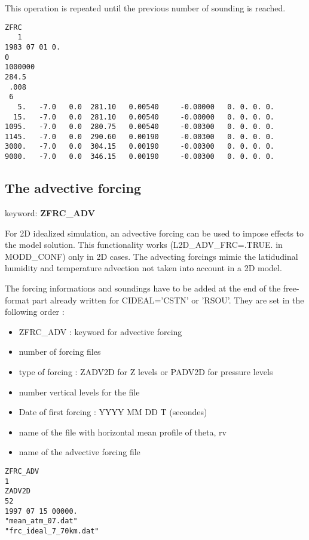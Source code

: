 This operation is repeated until the previous number of sounding is reached.

\begin{verbatim}
ZFRC
   1
1983 07 01 0.
0
1000000
284.5
 .008
 6
   5.   -7.0   0.0  281.10   0.00540     -0.00000   0. 0. 0. 0.
  15.   -7.0   0.0  281.10   0.00540     -0.00000   0. 0. 0. 0.
1095.   -7.0   0.0  280.75   0.00540     -0.00300   0. 0. 0. 0.
1145.   -7.0   0.0  290.60   0.00190     -0.00300   0. 0. 0. 0.
3000.   -7.0   0.0  304.15   0.00190     -0.00300   0. 0. 0. 0.
9000.   -7.0   0.0  346.15   0.00190     -0.00300   0. 0. 0. 0.
\end{verbatim}

\subsection{The advective forcing} \label{ss:adv_forcing}

keyword: {\bf ZFRC\_ADV} 

For 2D idealized simulation, an advective forcing can be used to impose effects to the model solution. This functionality works (L2D\_ADV\_FRC=.TRUE. in MODD\_CONF) only in 2D cases. The advecting forcings mimic the latidudinal humidity and temperature advection not taken into account in a 2D model.
         
The forcing informations and soundings have to be added at the end of the
free-format part already written for CIDEAL='CSTN' or 'RSOU'. They are set in the following order : 
\begin{itemize}
\item ZFRC\_ADV : keyword for advective forcing
\item number of forcing files
\item type of forcing : ZADV2D for Z levels or PADV2D for  pressure levels
\item number vertical levels for the file
\item Date of first forcing : YYYY MM DD T (secondes)
\item name of the file with horizontal mean profile of theta, rv
\item name of the advective forcing file
\end{itemize}

                                   
\begin{verbatim}
ZFRC_ADV
1
ZADV2D
52
1997 07 15 00000.
"mean_atm_07.dat"
"frc_ideal_7_70km.dat"
\end{verbatim}

